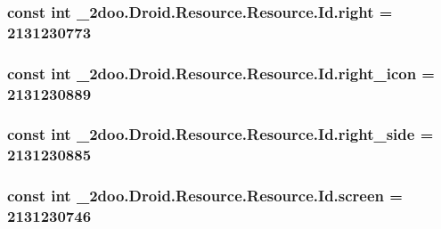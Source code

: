 \hypertarget{class__2doo_1_1_droid_1_1_resource_1_1_id_56bd3af653eef17a7d03b6cbd524347e}{
\subsubsection[{right}]{\setlength{\rightskip}{0pt plus 5cm}const int \_\-2doo.Droid.Resource.Resource.Id.right = 2131230773}}
\label{class__2doo_1_1_droid_1_1_resource_1_1_id_56bd3af653eef17a7d03b6cbd524347e}


\hypertarget{class__2doo_1_1_droid_1_1_resource_1_1_id_df7e39886ed0c5bf27b1b04edd9378b2}{
\subsubsection[{right\_\-icon}]{\setlength{\rightskip}{0pt plus 5cm}const int \_\-2doo.Droid.Resource.Resource.Id.right\_\-icon = 2131230889}}
\label{class__2doo_1_1_droid_1_1_resource_1_1_id_df7e39886ed0c5bf27b1b04edd9378b2}


\hypertarget{class__2doo_1_1_droid_1_1_resource_1_1_id_d689d29827fb4b3f0aada1444963cc61}{
\subsubsection[{right\_\-side}]{\setlength{\rightskip}{0pt plus 5cm}const int \_\-2doo.Droid.Resource.Resource.Id.right\_\-side = 2131230885}}
\label{class__2doo_1_1_droid_1_1_resource_1_1_id_d689d29827fb4b3f0aada1444963cc61}


\hypertarget{class__2doo_1_1_droid_1_1_resource_1_1_id_651c7e5f6b4690d2025beb1fabb3ab3b}{
\subsubsection[{screen}]{\setlength{\rightskip}{0pt plus 5cm}const int \_\-2doo.Droid.Resource.Resource.Id.screen = 2131230746}}
\label{class__2doo_1_1_droid_1_1_resource_1_1_id_651c7e5f6b4690d2025beb1fabb3ab3b}


